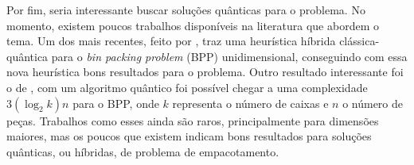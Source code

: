 Por fim, seria interessante buscar soluções quânticas para o problema.
No momento, existem poucos trabalhos disponíveis na literatura que abordem o tema.
Um dos mais recentes, feito por , traz uma heurística híbrida
clássica-quântica para o \textit{bin packing problem} (BPP) unidimensional, conseguindo com essa
nova heurística bons resultados para o problema.
Outro resultado interessante foi o de , com um algoritmo quântico
foi possível chegar a uma complexidade $3(\log_2 k)n$ para o BPP, onde $k$ representa o número de
caixas e $n$ o número de peças.
Trabalhos como esses ainda são raros, principalmente para dimensões maiores, mas os poucos que
existem indicam bons resultados para soluções quânticas, ou híbridas, de problema de empacotamento.
